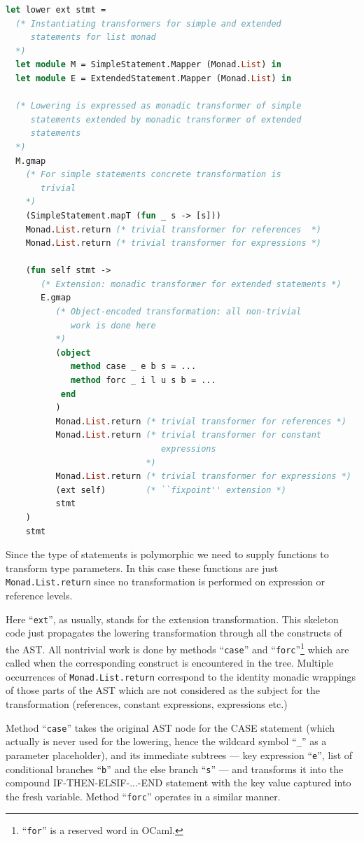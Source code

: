 \begin{lstlisting}[language=ocaml]
let lower ext stmt =
  (* Instantiating transformers for simple and extended 
     statements for list monad
  *)
  let module M = SimpleStatement.Mapper (Monad.List) in 
  let module E = ExtendedStatement.Mapper (Monad.List) in

  (* Lowering is expressed as monadic transformer of simple
     statements extended by monadic transformer of extended
     statements 
  *)
  M.gmap     
    (* For simple statements concrete transformation is
       trivial
    *)
    (SimpleStatement.mapT (fun _ s -> [s])) 
    Monad.List.return (* trivial transformer for references  *)
    Monad.List.return (* trivial transformer for expressions *)

    (fun self stmt ->
       (* Extension: monadic transformer for extended statements *)       
       E.gmap 
          (* Object-encoded transformation: all non-trivial
             work is done here
          *)
          (object
             method case _ e b s = ...
             method forc _ i l u s b = ...
           end
          ) 
          Monad.List.return (* trivial transformer for references *)
          Monad.List.return (* trivial transformer for constant 
                               expressions 
                            *)
          Monad.List.return (* trivial transformer for expressions *)
          (ext self)        (* ``fixpoint'' extension *)
          stmt
    )
    stmt
\end{lstlisting}

Since the type of statements is polymorphic we need to supply functions to transform
type parameters. In this case these functions are just \lstinline{Monad.List.return}
since no transformation is performed on expression or reference levels.

Here ``\lstinline{ext}'', as usually, stands for the extension transformation. This skeleton
code just propagates the lowering transformation through all the constructs of the AST. All
nontrivial work is done by methods ``\lstinline{case}'' and 
``\lstinline{forc}''\footnote{``\lstinline{for}'' is a reserved word in OCaml.} which are 
called when the corresponding construct is encountered in the tree. Multiple occurrences of \lstinline{Monad.List.return}
correspond to the identity monadic wrappings of those parts of the AST which are not 
considered as the subject for the transformation (references, constant expressions, expressions etc.)

Method ``\lstinline{case}'' takes the original AST node for the CASE statement 
(which actually is never used for the lowering, hence the wildcard symbol ``\lstinline{_}'' 
as a parameter placeholder), and its immediate subtrees --- key expression ``\lstinline{e}'',
list of conditional branches ``\lstinline{b}'' and the else branch ``\lstinline{s}'' --- and transforms it 
into the compound \mbox{IF-THEN-ELSIF-...-END} statement with the key value captured into the fresh variable.
Method ``\lstinline{forc}'' operates in a similar manner.

